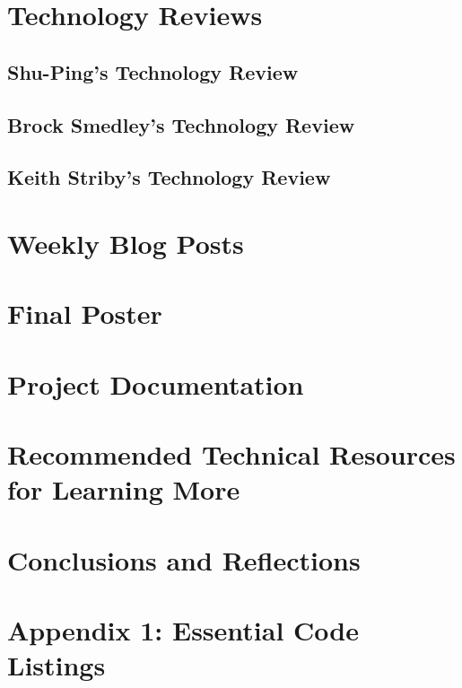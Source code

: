 \documentclass[letterpaper,10pt,serif,draftclsnofoot,onecolumn,compsoc,titlepage]{IEEEtran}
\begin{document}


\newpage

\section{Technology Reviews}

\subsection{Shu-Ping's Technology Review}

%

\newpage

\subsection{Brock Smedley's Technology Review}

%

\newpage

\subsection{Keith Striby's Technology Review}

%

\newpage

\section{Weekly Blog Posts}


\newpage

\section{Final Poster}


\newpage

\section{Project Documentation}


\newpage

\section{Recommended Technical Resources for Learning More}


\newpage

\section{Conclusions and Reflections}


\newpage

\section{Appendix 1: Essential Code Listings}


\nocite{*}
\newpage


\end{document}
